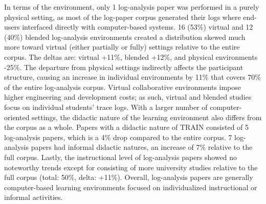 \documentclass[manuscript,screen,review]{acmart}
\begin{document}
In terms of the environment, only 1 log-analysis paper was performed in a purely physical setting, as most of the log-paper corpus generated their logs where end-users interfaced directly with computer-based systems. 16 (53\%) virtual and 12 (40\%) blended log-analysis environments created a distribution skewed much more toward virtual (either partially or fully) settings relative to the entire corpus. The deltas are: virtual +11\%, blended +12\%, and physical environments -25\%. The departure from physical settings indirectly affects the participant structure, causing an increase in individual environments by 11\% that covers 70\% of the entire log-analysis corpus. Virtual collaborative environments impose higher engineering and development costs; as such, virtual and blended studies focus on individual students' trace logs. With a larger number of computer-oriented settings, the didactic nature of the learning environment also differs from the corpus as a whole. Papers with a didactic nature of TRAIN consisted of 5 log-analysis papers, which is a 4\% drop compared to the entire corpus. 7 log-analysis papers had informal didactic natures, an increase of 7\% relative to the full corpus. Lastly, the instructional level of log-analysis papers showed no noteworthy trends except for consisting of more university studies relative to the full corpus (total: 50\%, delta: +11\%). Overall, log-analysis papers are generally computer-based learning environments focused on individualized instructional or informal activities.
\end{document}
